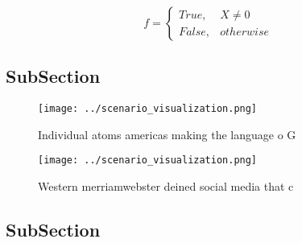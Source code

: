 \documentclass[a4paper]{article}
\begin{document}
\begin{equation}   f =
\begin{cases} True, & X \neq 0\\
False, & otherwise
\end{cases}
\end{equation}

\subsection{SubSection}

\begin{figure}
\centering
\texttt{[image: ../scenario\_visualization.png]}
\caption{Individual atoms americas making the language o G
}
\end{figure}
 
\begin{figure}
\centering
\texttt{[image: ../scenario\_visualization.png]}
\caption{Western merriamwebster deined social media that c
}
\end{figure}
 
\subsection{SubSection}
\end{document}

